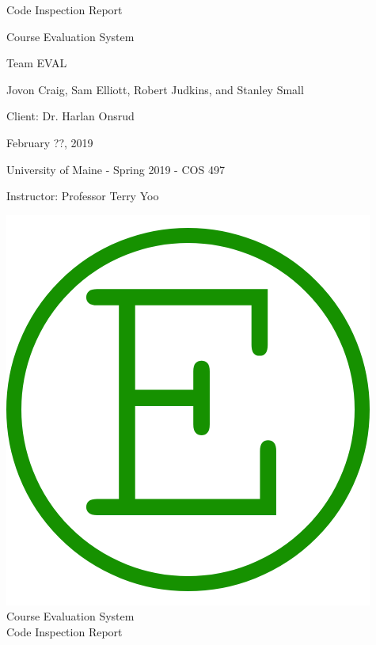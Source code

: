 \documentclass{article}
\begin{document}
\begin{titlepage}

\centering
\vspace*{2cm}
{\Huge Code Inspection Report\par}
\vspace{.25cm}
{\LARGE Course Evaluation System\par}
\vspace{1cm}
{\Large Team EVAL\par}
\vspace{.2cm}
{\Large Jovon Craig, Sam Elliott, Robert Judkins, and Stanley Small\par}
\vspace{1cm}
{\Large Client: Dr. Harlan Onsrud\par}
\vspace{1cm}
{\Large February ??, 2019\par}
\vspace{11cm}

University of Maine - Spring 2019 - COS 497

Instructor: Professor Terry Yoo

\end{titlepage}

\newpage

\begin{center}
{\includegraphics[scale=.2]{images/team_logo.png}} \\ 	\bigskip
{\LARGE Course Evaluation System } \\ \medskip
{\large Code Inspection Report } \\ \medskip
\end{center}
\end{document}
